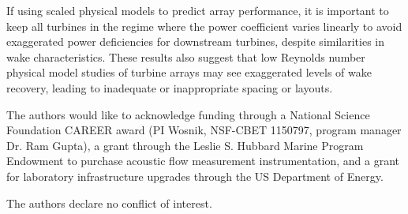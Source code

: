 \documentclass[energies,article,accept,moreauthors,pdftex,12pt,a4paper]{mdpi}
\begin{document}
If using scaled physical models to predict array performance, it is important to
keep all turbines in the regime where the power coefficient varies linearly to
avoid exaggerated power deficiencies for downstream turbines, despite
similarities in wake characteristics. These results also suggest that low
Reynolds number physical model studies of turbine arrays may see exaggerated
levels of wake recovery, leading to inadequate or inappropriate spacing or
layouts.



The authors would like to acknowledge funding through a National Science
Foundation CAREER award (PI Wosnik, NSF-CBET 1150797, program manager Dr. Ram
Gupta), a grant through the Leslie S. Hubbard Marine Program Endowment to
purchase acoustic flow measurement instrumentation, and a grant for laboratory
infrastructure upgrades through the US Department of Energy.


The authors declare no conflict of interest.




\end{document}
